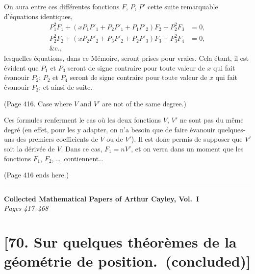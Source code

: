 \documentclass[11pt,a4paper]{book}
\begin{document}
On aura entre ces diff\'{e}rentes fonctions $F$, $P$, $P'$ cette suite remarquable d'\'{e}quations identiques,
\begin{align*}
P_1^2 F_1 + (xP_1P'_1 + P_2P'_1 + P_1P'_2) F_2 + P_2^2 F_3 &= 0, \\
P_2^2 F_2 + (xP_2P'_2 + P_3P'_2 + P_2P'_3) F_3 + P_3^2 F_4 &= 0, \\
\&\text{c.},
\end{align*}
lesquelles \'{e}quations, dans ce M\'{e}moire, seront prises pour vraies. Cela \'{e}tant, il est
\'{e}vident que $P_1$ et $P_3$ seront de signe contraire pour toute valeur de $x$ qui fait \'{e}vanouir
$P_2$; $P_2$ et $P_4$ seront de signe contraire pour toute valeur de $x$ qui fait \'{e}vanouir $P_3$; et
ainsi de suite.

(Page 416. Case where $V$ and $V'$ are not of the same degree.)

Ces formules renferment le cas o\`{u} les deux fonctions $V$, $V'$ ne sont pas du m\^{e}me
degr\'{e} (en effet, pour les y adapter, on n'a besoin que de faire \'{e}vanouir quelques-uns
des premiers coefficients de $V$ ou de $V'$). Il est donc permis de supposer que $V'$ soit
la d\'{e}riv\'{e}e de $V$. Dans ce cas, $F_1 = nV'$, et on verra dans un moment que les fonctions
$F_1$, $F_2$, \ldots\ contiennent\ldots

(Page 416 ends here.)

\bigskip
\hrule
\bigskip
\clearpage


\begin{center}
\Large\textbf{Collected Mathematical Papers of Arthur Cayley, Vol.\ I}\\[6pt]
\large\textit{Pages 417--468}
\end{center}

\vspace{1em}

\section*{[70. Sur quelques th\'{e}or\`{e}mes de la g\'{e}om\'{e}trie de position.\ (concluded)]}
\end{document}
